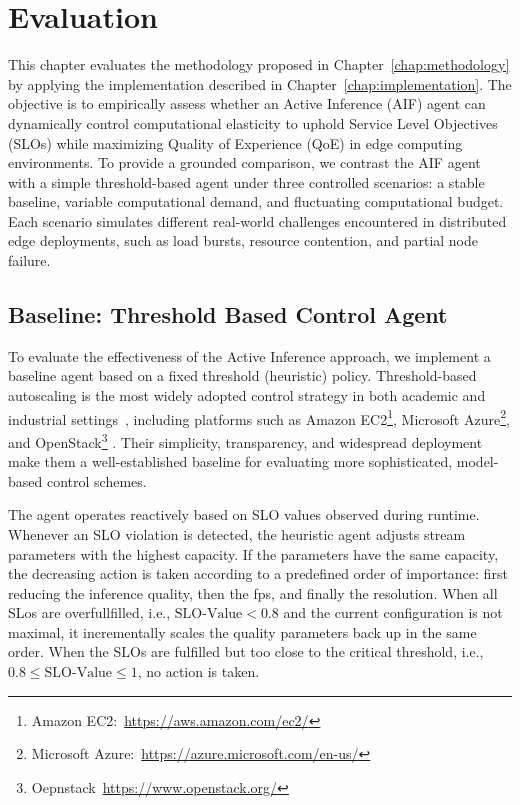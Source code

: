 \chapter{Evaluation}
\label{chap:evaluation}

This chapter evaluates the methodology proposed in Chapter~\ref{chap:methodology} by applying the implementation described in Chapter~\ref{chap:implementation}. The objective is to empirically assess whether an Active Inference (AIF) agent can dynamically control computational elasticity to uphold Service Level Objectives (SLOs) while maximizing Quality of Experience (QoE) in edge computing environments. To provide a grounded comparison, we contrast the AIF agent with a simple threshold-based agent under three controlled scenarios: a stable baseline, variable computational demand, and fluctuating computational budget. Each scenario simulates different real-world challenges encountered in distributed edge deployments, such as load bursts, resource contention, and partial node failure.

\section{Baseline: Threshold Based Control Agent}
\label{sec:evaluation-heuristic}

To evaluate the effectiveness of the Active Inference approach, we implement a baseline agent based on a fixed threshold (heuristic) policy. Threshold-based autoscaling is the most widely adopted control strategy in both academic and industrial settings~\cite{arabnejad_comparison_2017}, including platforms such as Amazon EC2\footnote{Amazon EC2:~\url{https://aws.amazon.com/ec2/}}, Microsoft Azure\footnote{Microsoft Azure:~\url{https://azure.microsoft.com/en-us/}}, and OpenStack\footnote{Oepnstack~\url{https://www.openstack.org/}}
. Their simplicity, transparency, and widespread deployment make them a well-established baseline for evaluating more sophisticated, model-based control schemes.

The agent operates reactively based on SLO values observed during runtime. Whenever an SLO violation is detected, the heuristic agent adjusts stream parameters with the highest capacity. If the parameters have the same capacity, the decreasing action is taken according to a predefined order of importance: first reducing the inference quality, then the fps, and finally the resolution. When all SLos are overfullfilled, i.e., \(\text{SLO-Value} < 0.8\) and the current configuration is not maximal, it incrementally scales the quality parameters back up in the same order.
When the SLOs are fulfilled but too close to the critical threshold, i.e., \(0.8 \leq \text{SLO-Value} \leq 1\), no action is taken.


